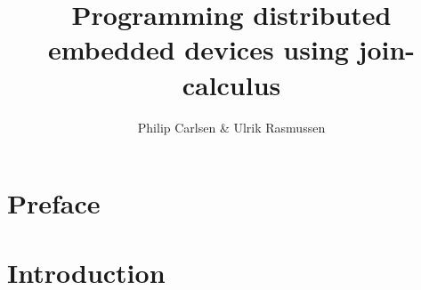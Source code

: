 \documentclass[a4paper, oneside, draft]{memoir}
\title{Programming distributed embedded devices using join-calculus}
\author{Philip Carlsen \& Ulrik Rasmussen}
\begin{document}
\frontmatter

\maketitle

\begin{abstract}

\end{abstract}

\clearpage
\chapter*{Preface}


\clearpage

\tableofcontents*


\mainmatter

\chapter{Introduction}





\end{document}
